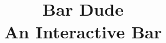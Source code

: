 \documentclass{acm_proc_article-sp}
\begin{document}
\title{Bar Dude \\ An Interactive Bar}
%
%
%
%
%
\end{document}

